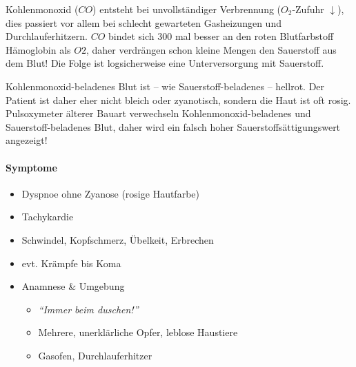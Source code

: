 Kohlenmonoxid ($CO$) entsteht bei unvollständiger
Verbrennung ($O_2$-Zufuhr ${\downarrow}$), dies passiert
vor allem bei schlecht gewarteten Gasheizungen und
Durchlauferhitzern. $CO$ bindet sich 300 mal besser an den
roten Blutfarbstoff Hämoglobin als $O2$, daher verdrängen
schon kleine Mengen den Sauerstoff aus dem Blut! Die Folge
ist logsicherweise eine Unterversorgung mit Sauerstoff.

Kohlenmonoxid-beladenes Blut ist -- wie
Sauerstoff-beladenes -- hellrot. Der Patient ist
daher eher nicht bleich oder zyanotisch, sondern
die Haut ist oft rosig. Pulsoxymeter älterer Bauart
verwechseln Kohlenmonoxid-beladenes und Sauerstoff-beladenes Blut, daher wird ein falsch hoher Sauerstoffsättigungswert angezeigt!

\paragraph{Symptome}

\begin{itemize}
    \item Dyspnoe  ohne  Zyanose (rosige Hautfarbe)
    \item Tachykardie
    \item Schwindel, Kopfschmerz, Übelkeit, Erbrechen
    \item evt. Krämpfe bis Koma
    \item Anamnese \& Umgebung
\begin{itemize}
    \item \emph{"`Immer beim duschen!"'}
    \item Mehrere, unerklärliche Opfer, leblose Haustiere
    \item Gasofen, Durchlauferhitzer
\end{itemize}
\end{itemize}



 








